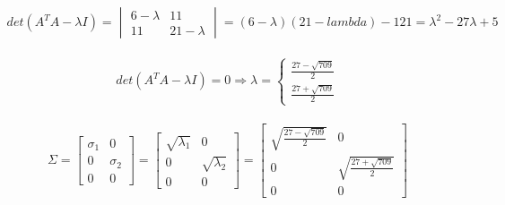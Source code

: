 \documentclass[a4paper, spanish]{article}
\begin{document}
  \begin{align}
    det(A^T A - \lambda I)
    = \begin{vmatrix}
      6 - \lambda & 11 \\
      11 & 21 - \lambda
    \end{vmatrix}
    = (6 - \lambda) (21 - lambda) - 121
    = \lambda ^ 2 - 27 \lambda + 5
  \end{align}


  \begin{align}
    det(A^T A - \lambda I) = 0
    \Rightarrow
    \lambda =
    \begin{cases}
    \frac{27 - \sqrt{709}}{2} \\
    \frac{27 + \sqrt{709}}{2}
    \end{cases}
  \end{align}



  \begin{align}
    \Sigma =
    \begin{bmatrix}
      \sigma_1 & 0 \\
      0 & \sigma_2 \\
      0 & 0
    \end{bmatrix}
    =
    \begin{bmatrix}
      \sqrt{\lambda_1} & 0 \\
      0 & \sqrt{\lambda_2} \\
      0 & 0
    \end{bmatrix} =
    \begin{bmatrix}
      \sqrt{\frac{27 - \sqrt{709}}{2}} & 0 \\
      0 & \sqrt{\frac{27 + \sqrt{709}}{2}} \\
      0 & 0
    \end{bmatrix}
  \end{align}
\end{document}
